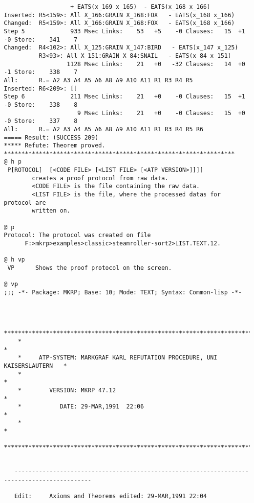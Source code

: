 {\begin{verbatim}
                   + EATS(x_169 x_165)  - EATS(x_168 x_166)
Inserted: R5<159>: All X_166:GRAIN X_168:FOX   - EATS(x_168 x_166)
Changed:  R5<159>: All X_166:GRAIN X_168:FOX   - EATS(x_168 x_166)
Step 5             933 Msec Links:    53   +5    -0 Clauses:   15  +1  -0 Store:    341    7
Changed:  R4<102>: All X_125:GRAIN X_147:BIRD   - EATS(x_147 x_125)
          R3<93>: All X_151:GRAIN X_84:SNAIL   - EATS(x_84 x_151)
                  1128 Msec Links:    21   +0   -32 Clauses:   14  +0  -1 Store:    338    7
All:      R.= A2 A3 A4 A5 A6 A8 A9 A10 A11 R1 R3 R4 R5 
Inserted: R6<209>: []
Step 6             211 Msec Links:    21   +0    -0 Clauses:   15  +1  -0 Store:    338    8
                     9 Msec Links:    21   +0    -0 Clauses:   15  +0  -0 Store:    337    8
All:      R.= A2 A3 A4 A5 A6 A8 A9 A10 A11 R1 R3 R4 R5 R6 
===== Result: (SUCCESS 209)
***** Refute: Theorem proved. ******************************************************************
@ h p
 P[ROTOCOL]  [<CODE FILE> [<LIST FILE> [<ATP VERSION>]]]]
        creates a proof protocol from raw data.
        <CODE FILE> is the file containing the raw data.
        <LIST FILE> is the file, where the processed datas for protocol are 
        written on. 

@ p
Protocol: The protocol was created on file 
	  F:>mkrp>examples>classic>steamroller-sort2>LIST.TEXT.12.

@ h vp
 VP      Shows the proof protocol on the screen.

@ vp
;;; -*- Package: MKRP; Base: 10; Mode: TEXT; Syntax: Common-lisp -*-



    ****************************************************************************
    *                                                                          *
    *     ATP-SYSTEM: MARKGRAF KARL REFUTATION PROCEDURE, UNI KAISERSLAUTERN   *
    *                                                                          *
    *        VERSION: MKRP 47.12                                               *
    *           DATE: 29-MAR,1991  22:06                                       *
    *                                                                          *
    ****************************************************************************

   
   --------------------------------------------------------------------------------------------

   Edit:     Axioms and Theorems edited: 29-MAR,1991 22:04 
   

\end{verbatim}}
